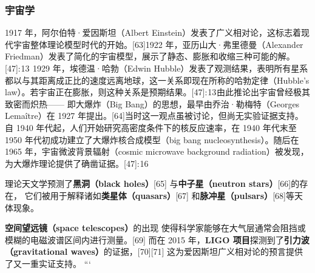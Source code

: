 \subsubsection{宇宙学}
1917 年，阿尔伯特·爱因斯坦（Albert Einstein）发表了广义相对论，这标志着现代宇宙整体理论模型时代的开始。[63]1922 年，亚历山大·弗里德曼（Alexander Friedman）发表了简化的宇宙模型，展示了静态、膨胀和收缩三种可能的解。[47]: 13  1929 年，埃德温·哈勃（Edwin Hubble）发表了观测结果，表明所有星系都以与其距离成正比的速度远离地球，这一关系即现在所称的哈勃定律（Hubble’s law）。若宇宙正在膨胀，则这种关系是预期结果。[47]: 13 由此推论出宇宙曾经极其致密而炽热—— 即大爆炸（Big Bang）的思想，最早由乔治·勒梅特（Georges Lemaître）在 1927 年提出。[64]当时这一观点虽被讨论，但尚无实验证据支持。自 1940 年代起，人们开始研究高密度条件下的核反应速率，在 1940 年代末至 1950 年代初成功建立了大爆炸核合成模型（big bang nucleosynthesis）。随后在 1965 年，宇宙微波背景辐射（cosmic microwave background radiation）被发现，为大爆炸理论提供了确凿证据。[47]: 16   

理论天文学预测了\textbf{黑洞（black holes）}[65]  
与\textbf{中子星（neutron stars）}[66]的存在，  
它们被用于解释诸如\textbf{类星体（quasars）}[67]  
和\textbf{脉冲星（pulsars）}[68]等天体现象。  

\textbf{空间望远镜（space telescopes）}的出现  
使得科学家能够在大气层通常会阻挡或模糊的电磁波谱区间内进行测量。[69]  
而在 2015 年，\textbf{LIGO 项目}探测到了\textbf{引力波（gravitational waves）}的证据，[70][71]  
这为爱因斯坦广义相对论的预言提供了又一重实证支持。
```
